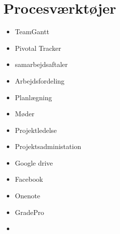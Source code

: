 \section*{Procesværktøjer}
\begin{itemize}
\item TeamGantt
\item Pivotal Tracker
\item samarbejdsaftaler
\item Arbejdsfordeling
\item Planlægning
\item Møder
\item Projektledelse
\item Projektsadministation
\item Google drive
\item Facebook
\item Onenote
\item GradePro
\item 

\end{itemize}





\cite{Aroom2009}





